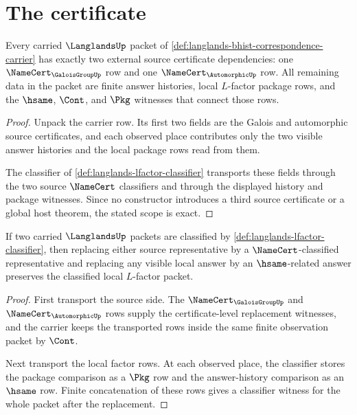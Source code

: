 \section{The certificate}
\label{sec:langlands-certificate}

\begin{theorem}
\label{thm:langlands-source-certificate-scope}
Every carried $\LanglandsUp$ packet of \autoref{def:langlands-bhist-correspondence-carrier} has exactly two external source certificate dependencies: one $\NameCert_{\GaloisGroupUp}$ row and one $\NameCert_{\AutomorphicUp}$ row. All remaining data in the packet are finite answer histories, local $L$-factor package rows, and the $\hsame$, $\Cont$, and $\Pkg$ witnesses that connect those rows.
\end{theorem}
\begin{proof}
Unpack the carrier row. Its first two fields are the Galois and automorphic source certificates, and each observed place contributes only the two visible answer histories and the local package rows read from them.

The classifier of \autoref{def:langlands-lfactor-classifier} transports these fields through the two source $\NameCert$ classifiers and through the displayed history and package witnesses. Since no constructor introduces a third source certificate or a global host theorem, the stated scope is exact.
\end{proof}

\begin{theorem}
\label{thm:langlands-local-factor-stability}
If two carried $\LanglandsUp$ packets are classified by \autoref{def:langlands-lfactor-classifier}, then replacing either source representative by a $\NameCert$-classified representative and replacing any visible local answer by an $\hsame$-related answer preserves the classified local $L$-factor packet.
\end{theorem}
\begin{proof}
First transport the source side. The $\NameCert_{\GaloisGroupUp}$ and $\NameCert_{\AutomorphicUp}$ rows supply the certificate-level replacement witnesses, and the carrier keeps the transported rows inside the same finite observation packet by $\Cont$.

Next transport the local factor rows. At each observed place, the classifier stores the package comparison as a $\Pkg$ row and the answer-history comparison as an $\hsame$ row. Finite concatenation of these rows gives a classifier witness for the whole packet after the replacement.
\end{proof}

